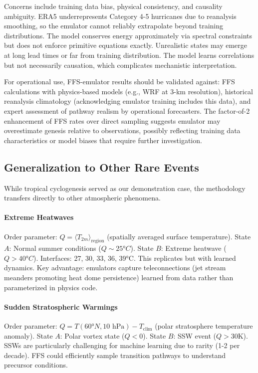 \documentclass[11pt]{article}
\begin{document}
Concerns include training data bias, physical consistency, and causality ambiguity. ERA5 underrepresents Category 4-5 hurricanes due to reanalysis smoothing, so the emulator cannot reliably extrapolate beyond training distributions. The model conserves energy approximately via spectral constraints but does not enforce primitive equations exactly. Unrealistic states may emerge at long lead times or far from training distribution. The model learns correlations but not necessarily causation, which complicates mechanistic interpretation.

For operational use, FFS-emulator results should be validated against: FFS calculations with physics-based models (e.g., WRF at 3-km resolution), historical reanalysis climatology (acknowledging emulator training includes this data), and expert assessment of pathway realism by operational forecasters. The factor-of-2 enhancement of FFS rates over direct sampling suggests emulator may overestimate genesis relative to observations, possibly reflecting training data characteristics or model biases that require further investigation.

\subsection{Generalization to Other Rare Events}

While tropical cyclogenesis served as our demonstration case, the methodology transfers directly to other atmospheric phenomena.

\paragraph{Extreme Heatwaves}
Order parameter: $Q = \langle T_{2m} \rangle_{\text{region}}$ (spatially averaged surface temperature). State $A$: Normal summer conditions ($Q \sim 25°C$). State $B$: Extreme heatwave ($Q > 40°C$). Interfaces: 27, 30, 33, 36, 39°C. This replicates \citet{ragone2018computation} but with learned dynamics. Key advantage: emulators capture teleconnections (jet stream meanders promoting heat dome persistence) learned from data rather than parameterized in physics code.

\paragraph{Sudden Stratospheric Warmings}
Order parameter: $Q = T(60°N, 10 \text{ hPa}) - T_{\text{clim}}$ (polar stratosphere temperature anomaly). State $A$: Polar vortex state ($Q < 0$). State $B$: SSW event ($Q > 30$K). SSWs are particularly challenging for machine learning due to rarity (1-2 per decade). FFS could efficiently sample transition pathways to understand precursor conditions.
\end{document}
